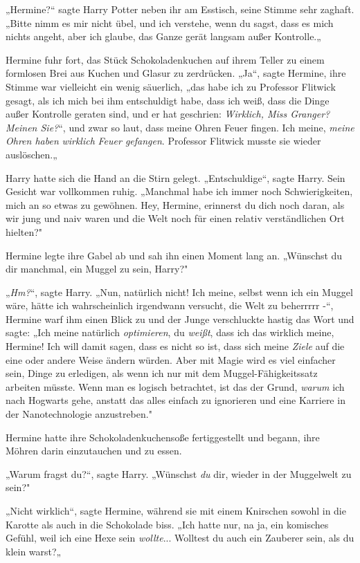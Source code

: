 {„Hermine?“ sagte Harry Potter neben ihr am Esstisch, seine Stimme sehr zaghaft. „Bitte nimm es mir nicht übel, und ich verstehe, wenn du sagst, dass es mich nichts angeht, aber ich glaube, das Ganze gerät langsam außer Kontrolle.„

Hermine fuhr fort, das Stück Schokoladenkuchen auf ihrem Teller zu einem formlosen Brei aus Kuchen und Glasur zu zerdrücken. „Ja“, sagte Hermine, ihre Stimme war vielleicht ein wenig säuerlich, „das habe ich zu Professor Flitwick gesagt, als ich mich bei ihm entschuldigt habe, dass ich weiß, dass die Dinge außer Kontrolle geraten sind, und er hat geschrien: \emph{Wirklich, Miss Granger? Meinen Sie?}“, und zwar so laut, dass meine Ohren Feuer fingen. Ich meine, \emph{meine Ohren haben} \emph{wirklich} \emph{Feuer gefangen}. Professor Flitwick musste sie wieder auslöschen.„

Harry hatte sich die Hand an die Stirn gelegt. „Entschuldige“, sagte Harry. Sein Gesicht war vollkommen ruhig. „Manchmal habe ich immer noch Schwierigkeiten, mich an so etwas zu gewöhnen. Hey, Hermine, erinnerst du dich noch daran, als wir jung und naiv waren und die Welt noch für einen relativ verständlichen Ort hielten?"

Hermine legte ihre Gabel ab und sah ihn einen Moment lang an. „Wünschst du dir manchmal, ein Muggel zu sein, Harry?"

„\emph{Hm?}“, sagte Harry. „Nun, natürlich nicht! Ich meine, selbst wenn ich ein Muggel wäre, hätte ich wahrscheinlich irgendwann versucht, die Welt zu beherrrrr -“, Hermine warf ihm einen Blick zu und der Junge verschluckte hastig das Wort und sagte: „Ich meine natürlich \emph{optimieren}, du \emph{weißt}, dass ich das wirklich meine, Hermine! Ich will damit sagen, dass es nicht so ist, dass sich meine \emph{Ziele} auf die eine oder andere Weise ändern würden. Aber mit Magie wird es viel einfacher sein, Dinge zu erledigen, als wenn ich nur mit dem Muggel-Fähigkeitssatz arbeiten müsste. Wenn man es logisch betrachtet, ist das der Grund, \emph{warum} ich nach Hogwarts gehe, anstatt das alles einfach zu ignorieren und eine Karriere in der Nanotechnologie anzustreben."

Hermine hatte ihre Schokoladenkuchensoße fertiggestellt und begann, ihre Möhren darin einzutauchen und zu essen.

„Warum fragst du?“, sagte Harry. „Wünschst \emph{du} dir, wieder in der Muggelwelt zu sein?"

„Nicht wirklich“, sagte Hermine, während sie mit einem Knirschen sowohl in die Karotte als auch in die Schokolade biss. „Ich hatte nur, na ja, ein komisches Gefühl, weil ich eine Hexe sein \emph{wollte}... Wolltest du auch ein Zauberer sein, als du klein warst?„

}
